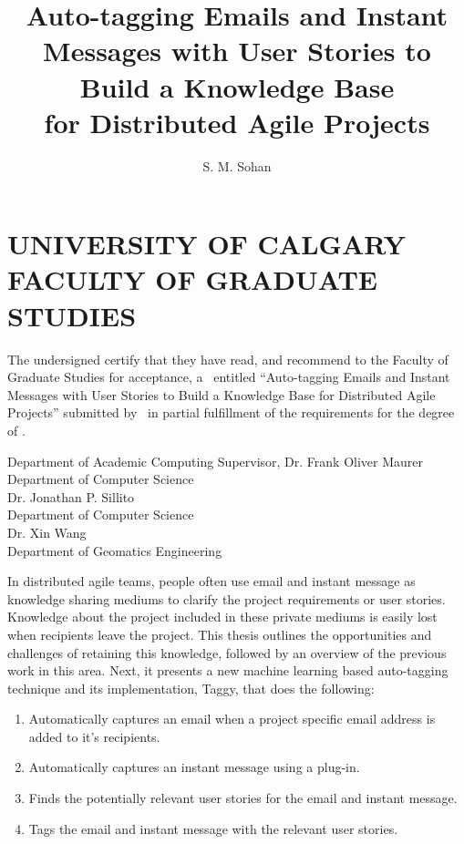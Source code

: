 \documentclass{ucalgthes1}
\title{Auto-tagging Emails and Instant Messages with User Stories to Build a Knowledge Base\\ 
\bigskip for Distributed Agile Projects}
\author{S. M. Sohan}
\newcommand{\thesistitle}{Auto-tagging Emails and Instant Messages with User Stories to Build a Knowledge Base for Distributed Agile Projects}
\begin{document}
\makethesistitle
{}     %
\setcounter{page}{1}
\chapter*{UNIVERSITY OF CALGARY \\ FACULTY OF GRADUATE STUDIES}
\thispagestyle{empty}
The undersigned certify that they have read, and recommend
to the Faculty of Graduate Studies for acceptance, a \Thesis\ entitled
``\thesistitle'' submitted by \Author\
in partial fulfillment of the requirements for the degree of
\Degree.\\

%
%
\begin{signing}{Department of Academic Computing}
\signline
Supervisor, Dr. Frank Oliver Maurer \\
Department of Computer Science \\
\signline
Dr. Jonathan P. Sillito\\
Department of Computer Science \\
\signline
Dr. Xin Wang \\
Department of Geomatics Engineering \\
\end{signing}
%
\newpage
{}
{} 
In distributed agile teams, people often use email and instant message as knowledge sharing mediums to clarify the project requirements or user stories. Knowledge about the project included in these private mediums is easily lost when recipients leave the project. This thesis outlines the opportunities and challenges of retaining this knowledge, followed by an overview of the previous work in this area. Next, it presents a new machine learning based auto-tagging technique and its implementation, Taggy, that does the following:
\begin{enumerate}
	\item Automatically captures an email when a project specific email address is added to it's recipients.
	\item Automatically captures an instant message using a plug-in.
	\item Finds the potentially relevant user stories for the email and instant message.
	\item Tags the email and instant message with the relevant user stories.
\end{enumerate}
\end{document}
